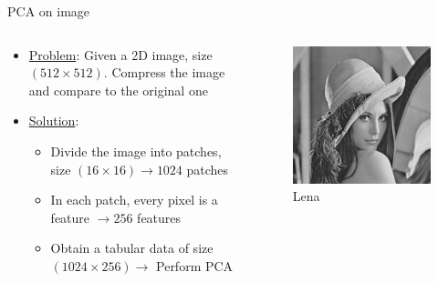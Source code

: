 \begin{frame}{PCA on image}
    \begin{columns}
        \begin{column}{0.6\textwidth}
            \begin{itemize}
                \item \uline{Problem}: Given a 2D image, size $(512\times 512)$. Compress the image and compare to the original one
                \item \uline{Solution}:
                \begin{itemize}
                    \item Divide the image into patches, size $(16\times 16) \rightarrow 1024$ patches
                    \item In each patch, every pixel is a feature $\rightarrow 256$ features
                    \item Obtain a tabular data of size $(1024\times 256) \to$ Perform PCA
                \end{itemize}
            \end{itemize}
        \end{column}

        \begin{column}{0.4\textwidth}
            \begin{figure}
                \centering
                \includegraphics[width=\linewidth]{img/lena.png}
                \caption{Lena}
            \end{figure}
        \end{column}
    \end{columns}
\end{frame}

